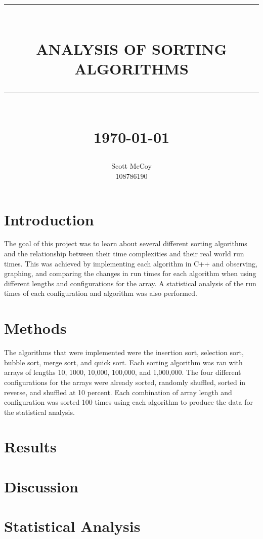 \documentclass[12pt]{report}
\newcommand{\HRule}[1]{\rule{\linewidth}{#1}}
\begin{document}
\title{ \normalsize \textsc{}
        \\ [2.0cm]
        \HRule{0.5pt} \\
        \LARGE \textbf{\uppercase{Analysis of Sorting Algorithms}}
        \HRule{2pt} \\ [0.5cm]
        \normalsize \today \vspace*{5\baselineskip}}

\date{}

\author{
        Scott McCoy \\ 
        108786190 \\
       	}

\maketitle
\tableofcontents
\newpage

\sectionfont{\scshape}


\section*{Introduction}
	The goal of this project was to learn about several different
	sorting algorithms and the relationship between their time 
	complexities and their real world run times. This was achieved
	by implementing each algorithm in C++ and observing, graphing, 
	and comparing the changes in run times for each algorithm when 
	using different lengths and configurations for the array. A
	statistical analysis of the run times of each configuration
	and algorithm was also performed.

\section*{Methods}
	The algorithms that were implemented were the insertion sort,
	selection sort, bubble sort, merge sort, and quick sort. Each 
	sorting algorithm was ran with arrays of lengths 10, 1000, 10,000,
	100,000, and 1,000,000. The four different configurations for
	the arrays were already sorted, randomly shuffled, sorted in reverse,
	and shuffled at 10 percent. Each combination of array length and 
	configuration was sorted 100 times using each algorithm to produce the
	data for the statistical analysis.

\section*{Results}

\section*{Discussion}

\section*{Statistical Analysis}
\end{document}
